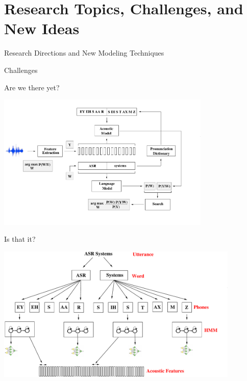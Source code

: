 \section{Research Topics, Challenges, and New Ideas}

\begin{frame}
  \begin{center}
    {\color{Maroon}\Huge Research Directions and New Modeling Techniques\par}
  \end{center}
\end{frame}


\begin{frame}
  \begin{center}
    {\color{Maroon}\Huge Challenges}
  \end{center}
\end{frame}

\begin{frame}{Are we there yet?}
  \begin{center}
    \includegraphics[height=65mm]{figures/ASR9}
  \end{center}
\end{frame}

\begin{frame}{Is that it?}
  \begin{center}
    \includegraphics[height=65mm]{figures/am-mlp}
  \end{center}
\end{frame}

